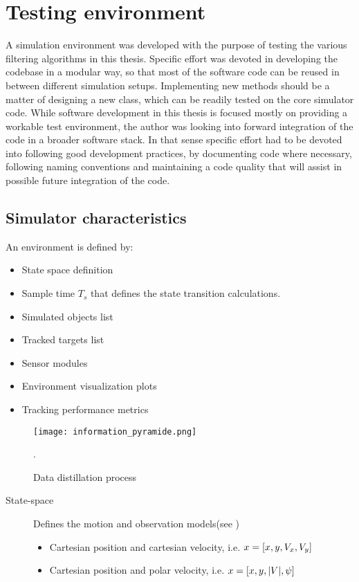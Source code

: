 
\chapter{Testing environment }

A simulation environment was developed with the purpose of testing the various filtering algorithms in this thesis. Specific effort was devoted in developing the codebase in a modular way, so that most of the software code can be reused in between different simulation setups. Implementing new methods should be a matter of designing a new class, which can be readily tested on the core simulator code. While software development in this thesis is focused mostly on providing a workable test environment, the author was looking into forward integration of the code in a broader software stack. In that sense specific effort had to be devoted into following good development practices, by documenting code where necessary, following naming conventions and maintaining a code quality that will assist in possible future integration of the code.


\section{Simulator characteristics}

An environment is defined by:
\begin{itemize}
	\item State space definition 
	\item Sample time $T_s$ that defines the state transition calculations.
	\item Simulated objects list
	\item Tracked targets list
	\item Sensor modules
	\item Environment visualization plots
	\item Tracking performance metrics
\end{itemize}


\begin{figure}[H]
	\centering
	\texttt{[image: information\_pyramide.png]}
	\caption{Data distillation process}.
	\label{fig:information_pyramide}
\end{figure}


\begin{description}
	\item[State-space] Defines the motion and observation models(see )
	\begin{itemize}
		\item Cartesian position and cartesian velocity, i.e. $ x=[x,y,{V}_x, {V}_y] $
		\item Cartesian position and polar velocity, i.e. $ x = [x,y,|{V}|,{\psi}]$
	\end{itemize}
\end{description}

